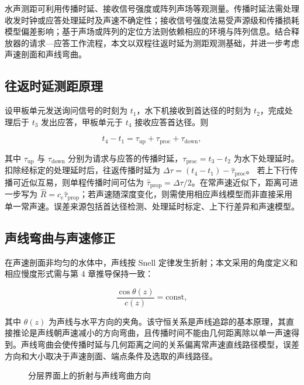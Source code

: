 水声测距可利用传播时延、接收信号强度或阵列声场等观测量。传播时延法需处理收发时钟或应答处理延时及声速不确定性；接收信号强度法易受声源级和传播损耗模型偏差影响；基于声场或阵列的定位方法则依赖相应的环境与阵列信息\cite{bergerStratificationEffectCompensation2008,sunRelationshipPropagationTime2019,liuProspectsProblemsWireless2008}。结合释放器的请求—应答工作流程，本文以双程往返时延为测距观测基础，并进一步考虑声速剖面和声线弯曲。

\subsection{往返时延测距原理}

设甲板单元发送询问信号的时刻为 $t_1$，水下机接收到首达径的时刻为 $t_2$，完成处理后于 $t_3$ 发出应答，甲板单元于 $t_4$ 接收应答首达径。则

\begin{equation}
  t_4-t_1=\tau_{\mathrm{up}}+\tau_{\mathrm{proc}}+\tau_{\mathrm{down}},
  \label{eq:rtt_model}
\end{equation}

其中 $\tau_{\mathrm{up}}$ 与 $\tau_{\mathrm{down}}$ 分别为请求与应答的传播时延，$\tau_{\mathrm{proc}}=t_3-t_2$ 为水下处理延时。扣除经标定的处理延时后，往返传播时延为
$\Delta\tau=(t_4-t_1)-\hat{\tau}_{\mathrm{proc}}$。
若上下行传播可近似互易，则单程传播时间可估为 $\hat{\tau}_{\mathrm{prop}}=\Delta\tau/2$。在常声速近似下，距离可进一步写为 $\hat{R}=c_e\hat{\tau}_{\mathrm{prop}}$；若声速随深度变化，则需使用相应声线模型而非直接采用单一常声速。误差来源包括首达径检测、处理延时标定、上下行差异和声速模型。

\subsection{声线弯曲与声速修正}

在声速剖面非均匀的水体中，声线按 Snell 定律发生折射；本文采用的角度定义和相应慢度形式需与第 4 章推导保持一致：

\begin{equation}
  \frac{\cos\theta(z)}{c(z)} = \text{const},
  \label{eq:snell}
\end{equation}

其中 $\theta(z)$ 为声线与水平方向的夹角。该守恒关系是声线追踪的基本原理，其直接推论是声线朝声速减小的方向弯曲，且传播时间不能由几何距离除以单一声速得到。声线弯曲会使传播时延与几何距离之间的关系偏离常声速直线路径模型，误差方向和大小取决于声速剖面、端点条件及选取的声线路径。

\begin{figure}[htbp]
  \centering
  \begin{tikzpicture}[x=1cm,y=1cm]
   
  \end{tikzpicture}
  \caption[分层界面上的折射与声线弯曲方向]{分层界面上的折射与声线弯曲方向}
 \label{fig:chap02_snell}
\end{figure}

